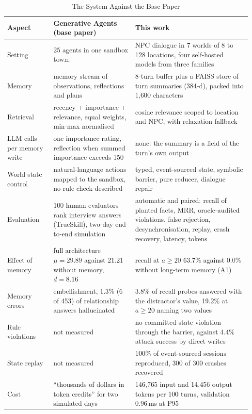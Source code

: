 \documentclass[letterpaper,journal,onecolumn]{IEEEtran}
\begin{document}
\begin{table}[!btp]
\centering\scriptsize
\caption{The System Against the Base Paper}
\label{tab:base}
\begin{tabularx}{\linewidth}{@{}>{\raggedright\arraybackslash}p{2.9cm} L L@{}}
\toprule
Aspect & Generative Agents (base paper) & This work \\
\midrule
Setting & 25 agents in one sandbox town,  & NPC dialogue in 7 worlds of 8 to 128 locations, four self-hosted models from three families \\
Memory & memory stream of observations, reflections and plans & 8-turn buffer plus a FAISS store of turn summaries (384-d), packed into 1{,}600 characters \\
Retrieval & recency + importance + relevance, equal weights, min-max normalised & cosine relevance scoped to location and NPC, with relaxation fallback \\
LLM calls per memory write & one importance rating, reflection when summed importance exceeds 150 & none: the summary is a field of the turn's own output \\
World-state control & natural-language actions mapped to the sandbox, no rule check described & typed, event-sourced state, symbolic barrier, pure reducer, dialogue repair \\
Evaluation & 100 human evaluators rank interview answers (TrueSkill), two-day end-to-end simulation & automatic and paired: recall of planted facts, MRR, oracle-audited violations, false rejection, desynchronisation, replay, crash recovery, latency, tokens \\
Effect of memory & full architecture $\mu=29.89$ against 21.21 without memory, $d=8.16$ & recall at $a\ge20$ 63.7\% against 0.0\% without long-term memory (A1) \\
Memory errors & embellishment, 1.3\% (6 of 453) of relationship answers hallucinated & 3.8\% of recall probes answered with the distractor's value, 19.2\% at $a\ge20$ naming two values \\
Rule violations & not measured & no committed state violation through the barrier, against 4.4\% attack success by direct writes \\
State replay & not measured & 100\% of event-sourced sessions reproduced, 300 of 300 crashes recovered \\
Cost & ``thousands of dollars in token credits'' for two simulated days & 146{,}765 input and 14{,}456 output tokens per 100 turns, validation 0.96\,ms at P95 \\
\bottomrule
\end{tabularx}
\end{table}
\end{document}
